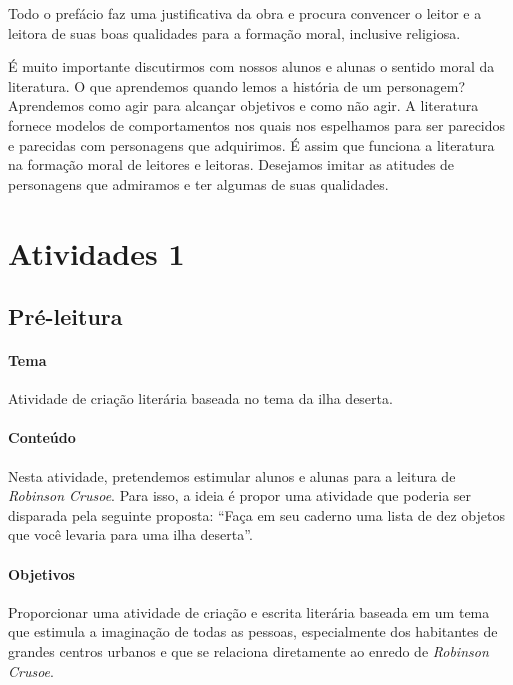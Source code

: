\documentclass{article}
\begin{document}
Todo o prefácio faz uma justificativa da obra e procura convencer o
leitor e a leitora de suas boas qualidades para a formação moral,
inclusive religiosa.

É muito importante discutirmos com nossos alunos e alunas o sentido
moral da literatura. O que aprendemos quando lemos a história de um
personagem? Aprendemos como agir para alcançar objetivos e como não
agir. A literatura fornece modelos de comportamentos nos quais nos
espelhamos para ser parecidos e parecidas com personagens que
adquirimos. É assim que funciona a literatura na formação moral de
leitores e leitoras. Desejamos imitar as atitudes de personagens que
admiramos e ter algumas de suas qualidades.



\section{Atividades 1}


\subsection{Pré-leitura}


\paragraph{Tema} Atividade de criação literária baseada no tema da ilha deserta.

\paragraph{Conteúdo}
Nesta atividade, pretendemos estimular alunos e alunas para a leitura de
\emph{Robinson Crusoe}. Para isso, a ideia é propor uma atividade que
poderia ser disparada pela seguinte proposta: ``Faça em seu caderno uma
lista de dez objetos que você levaria para uma ilha deserta''.


\paragraph{Objetivos}
Proporcionar uma atividade de criação e escrita literária baseada em um
tema que estimula a imaginação de todas as pessoas, especialmente dos
habitantes de grandes centros urbanos e que se relaciona diretamente ao
enredo de \emph{Robinson Crusoe}.
\end{document}
